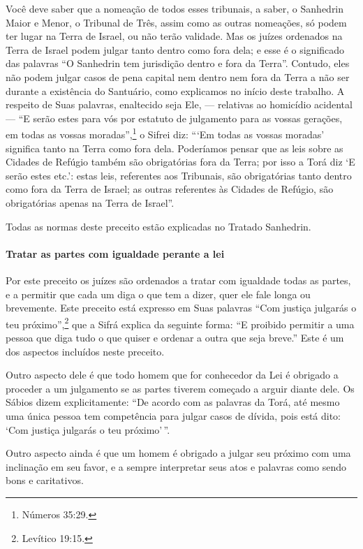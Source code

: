 \begin{multicols}{2}
Você deve saber que a nomeação de todos esses tribunais, a saber, o
Sanhedrin\starr{} Maior e Menor, o Tribunal de Três, assim como as outras
nomeações, só podem ter lugar na Terra de Israel, ou não terão
validade. Mas os juízes ordenados na Terra de Israel podem julgar tanto
dentro como fora dela; e esse é o significado das palavras ``O Sanhedrin\starr{}
tem jurisdição dentro e fora da Terra''. Contudo, eles não podem julgar
casos de pena capital nem dentro nem fora da Terra a não ser durante a
existência do Santuário, como explicamos no início deste trabalho. A
respeito de Suas palavras, enaltecido seja Ele, --- relativas ao
homicídio acidental --- ``E serão estes para vós por estatuto de
julgamento para as vossas gerações, em todas as vossas moradas'',\footnote{Números 35:29.} o Sifrei\starr{} diz: ```Em todas as vossas moradas' significa
tanto na Terra como fora dela. Poderíamos pensar que as leis sobre as
Cidades de Refúgio também são obrigatórias fora da Terra; por isso a
Torá\starr{} diz `E serão estes etc.': estas leis, referentes aos Tribunais,
são obrigatórias tanto dentro como fora da Terra de Israel; as outras
referentes às Cidades de Refúgio, são obrigatórias apenas na Terra de
Israel''.

Todas as normas deste preceito estão explicadas no Tratado Sanhedrin\starr.

\paragraph{Tratar as partes com igualdade perante a lei}

Por este preceito os juízes são ordenados a tratar com igualdade todas
as partes, e a permitir que cada um diga o que tem a dizer, quer ele
fale longa ou brevemente. Este preceito está expresso em Suas palavras
``Com justiça julgarás o teu próximo'',\footnote{Levítico 19:15.} que a Sifrá\starr{}
explica da seguinte forma: ``E proibido permitir a uma pessoa que diga
tudo o que quiser e ordenar a outra que seja breve.'' Este é um dos
aspectos incluídos neste preceito.

Outro aspecto dele é que todo homem que for conhecedor da Lei é obrigado
a proceder a um julgamento se as partes tiverem começado a arguir diante
dele. Os Sábios dizem explicitamente: ``De acordo com as palavras da
Torá\starr, até mesmo uma única pessoa tem competência para julgar casos de
dívida, pois está dito: `Com justiça julgarás o teu próximo'\,''.

Outro aspecto ainda é que um homem é obrigado a julgar seu próximo com
uma inclinação em seu favor, e a sempre interpretar seus atos e
palavras como sendo bons e caritativos.


\end{multicols}
